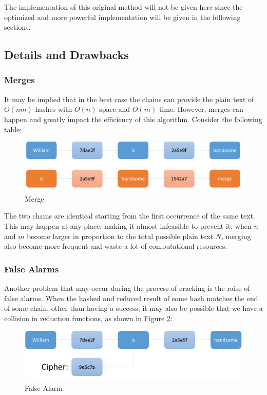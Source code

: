\documentclass{article}
\begin{document}
\begin{multicols}{2}
The implementation of this original method will not be given here since the optimized and more powerful implementation will be given in the following sections.

\subsection{Details and Drawbacks}
\subsubsection{Merges}
It may be implied that in the best case the chains can provide the plain text of $O(nm)$ hashes with $O(n)$ space and $O(m)$ time. However, merges can happen and greatly impact the efficiency of this algorithm. Consider the following table:

\begin{figure}[H]
	\centering
	\includegraphics[width=\linewidth]{img/hashmerge}
	\caption{Merge}
	\label{fig:hashmerge}
\end{figure}

The two chains are identical starting from the first occurrence of the same text. This may happen at any place, making it almost infeasible to prevent it; when $n$ and $m$ become larger in proportion to the total possible plain text $N$, merging also become more frequent and waste a lot of computational resources.

\subsubsection{False Alarms}
Another problem that may occur during the process of cracking is the raise of false alarms. When the hashed and reduced result of some hash matches the end of some chain, other than having a success, it may also be possible that we have a collision in reduction functions, as shown in Figure \ref{fig:hashfalsealarm}:
\begin{figure}[H]
	\centering
	\includegraphics[width=\linewidth]{img/hashFalseAlarm}
	\caption{False Alarm}
	\label{fig:hashfalsealarm}
\end{figure}


\end{multicols}
\end{document}
